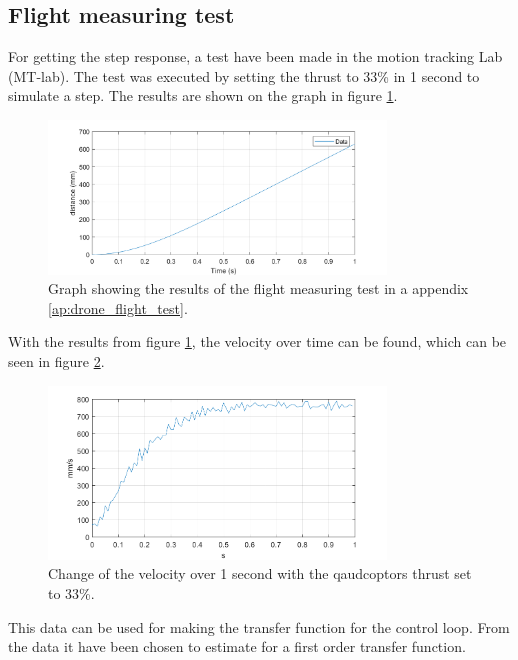 \subsection*{Flight measuring test}
For getting the step response, a test have been made in the motion tracking Lab (MT-lab). The test was executed by setting the thrust to 33\% in 1 second to simulate a step. The results are shown on the graph in figure \ref{fig:results_mesuring_test_drone}.
\begin{figure}[h]
    \centering
    \includegraphics[width=0.8\textwidth]{figures/Appendix/measuringTest/DroneTest.png}
    \caption{Graph showing the results of the flight measuring test in a appendix \ref{ap:drone_flight_test}.}
    \label{fig:results_mesuring_test_drone}
\end{figure}
\newline
With the results from figure \ref{fig:results_mesuring_test_drone}, the velocity over time can be found, which can be seen in figure \ref{fig:DroneVelocity}.
\begin{figure}[h]
    \centering
    \includegraphics[width=0.8\textwidth]{figures/ch_movement/velocityDrone.png}
    \caption{Change of the velocity over 1 second with the qaudcoptors thrust set to 33\%.}
    \label{fig:DroneVelocity}
\end{figure}
\newline
This data can be used for making the transfer function for the control loop. From the data it have been chosen to estimate for a first order transfer function. 

